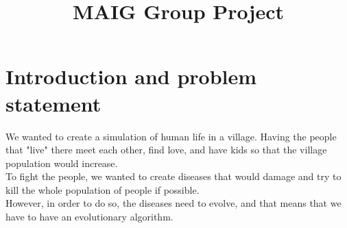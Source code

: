 \documentclass[conference,compsoc]{IEEEtran}
\begin{document}
\title{MAIG Group Project}

\author{
\and
{}
}

\maketitle



\IEEEpeerreviewmaketitle



\section{Introduction and problem statement}
We wanted to create a simulation of human life in a village. Having the people that "live" there meet each other, find love, and have kids so that the village population would increase.\\
To fight the people, we wanted to create diseases that would damage and try to kill the whole population of people if possible.\\
However, in order to do so, the diseases need to evolve, and that means that we have to have an evolutionary algorithm.\\
\end{document}
